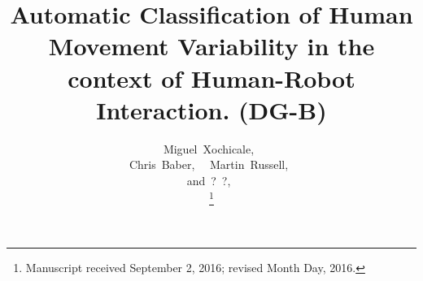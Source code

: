 \documentclass[9pt,journal,onecolumn,compsoc]{IEEEtran}
\begin{document}
%
\title{
  Automatic Classification of  Human Movement Variability  in the context of  Human-Robot Interaction. (DG-B)
}



%
%

\author{
 	Miguel~Xochicale,~\\
         Chris~Baber,~
         ~Martin~Russell,~ \\
         and~?~?,~

\thanks{Manuscript received September 2, 2016; revised Month Day, 2016.}
}
\end{document}
